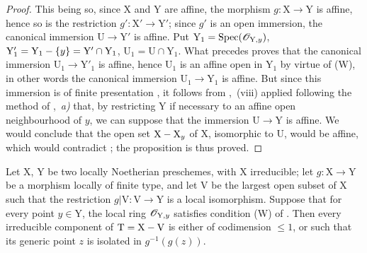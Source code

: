 \begin{proof}
This being so, since $\mathrm{X}$ and $\mathrm{Y}$ are affine, the morphism $g:\mathrm{X}\to\mathrm{Y}$ is affine, hence so is the restriction $g':\mathrm{X}'\to\mathrm{Y}'$; since $g'$ is an open immersion, the canonical immersion $\mathrm{U}\to\mathrm{Y}'$ is affine. Put $\mathrm{Y}_1=\operatorname{Spec}(\mathscr{O}_{\mathrm{Y},y})$, $\mathrm{Y}'_1=\mathrm{Y}_1-\{y\}=\mathrm{Y}'\cap\mathrm{Y}_1$, $\mathrm{U}_1=\mathrm{U}\cap\mathrm{Y}_1$. What precedes proves that the canonical immersion $\mathrm{U}_1\to\mathrm{Y}'_1$ is affine, hence $\mathrm{U}_1$ is an affine open in $\mathrm{Y}_1$ by virtue of (W), in other words the canonical immersion $\mathrm{U}_1\to\mathrm{Y}_1$ is affine. But since this immersion is of finite presentation , it follows from ,~(viii) applied following the method of ,~\emph{a)} that, by restricting $\mathrm{Y}$ if necessary to an affine open neighbourhood of $y$, we can suppose that the immersion $\mathrm{U}\to\mathrm{Y}$ is affine. We would conclude that the open set $\mathrm{X}-\mathrm{X}_y$ of $\mathrm{X}$, isomorphic to $\mathrm{U}$, would be affine, which would contradict ; the proposition is thus proved.
\end{proof}

\begin{corollary}[21.12.11]
\label{IV.21.12.11}
Let $\mathrm{X}$, $\mathrm{Y}$ be two locally Noetherian preschemes, with $\mathrm{X}$ irreducible; let $g:\mathrm{X}\to\mathrm{Y}$ be a morphism locally of finite type, and let $\mathrm{V}$ be the largest open subset of $\mathrm{X}$ such that the restriction $g|\mathrm{V}:\mathrm{V}\to\mathrm{Y}$ is a local isomorphism.
Suppose that for every point $y\in\mathrm{Y}$, the local ring $\mathscr{O}_{\mathrm{Y},y}$ satisfies condition \textup{(W)} of .
Then every irreducible component of $\mathrm{T}=\mathrm{X}-\mathrm{V}$ is \textup{either} of codimension $\leq1$, \textup{or} such that its generic point $z$ is isolated in $g^{-1}(g(z))$.
\end{corollary}


